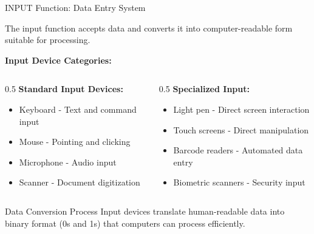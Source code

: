 \documentclass[aspectratio=169]{beamer}
\begin{document}
\begin{frame}{INPUT Function: Data Entry System}
    \begin{definition}
        The input function accepts data and converts it into computer-readable form suitable for processing.
    \end{definition}
    
    \vspace{0.3cm}
    \textbf{Input Device Categories:}
    \begin{columns}
        \begin{column}{0.5\textwidth}
            \textbf{Standard Input Devices:}
            \begin{itemize}
                \item Keyboard - Text and command input
                \item Mouse - Pointing and clicking
                \item Microphone - Audio input
                \item Scanner - Document digitization
            \end{itemize}
        \end{column}
        \begin{column}{0.5\textwidth}
            \textbf{Specialized Input:}
            \begin{itemize}
                \item Light pen - Direct screen interaction
                \item Touch screens - Direct manipulation
                \item Barcode readers - Automated data entry
                \item Biometric scanners - Security input
            \end{itemize}
        \end{column}
    \end{columns}
    
    \vspace{0.3cm}
    \begin{exampleblock}{Data Conversion Process}
        Input devices translate human-readable data into binary format (0s and 1s) that computers can process efficiently.
    \end{exampleblock}
\end{frame}
\end{document}
